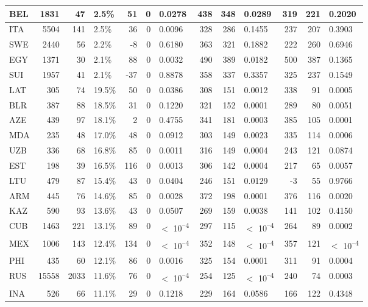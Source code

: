 \begin{tabular}{l|r|r|l|r|r|l|r|r|l|r|r|l}
\hline
BEL & 1831 & 47 & 2.5\% & 51 & 0 & 0.0278 & 438 & 348 & 0.0289 & 319 & 221 & 0.2020\\
\hline
ITA & 5504 & 141 & 2.5\% & 36 & 0 & 0.0096 & 328 & 286 & 0.1455 & 237 & 207 & 0.3903\\
\hline
SWE & 2440 & 56 & 2.2\% & -8 & 0 & 0.6180 & 363 & 321 & 0.1882 & 222 & 260 & 0.6946\\
\hline
EGY & 1371 & 30 & 2.1\% & 88 & 0 & 0.0032 & 490 & 389 & 0.0182 & 500 & 387 & 0.1365\\
\hline
SUI & 1957 & 41 & 2.1\% & -37 & 0 & 0.8878 & 358 & 337 & 0.3357 & 325 & 237 & 0.1549\\
\hline
LAT & 305 & 74 & 19.5\% & 50 & 0 & 0.0386 & 308 & 151 & 0.0012 & 338 & 91 & 0.0005\\
\hline
BLR & 387 & 88 & 18.5\% & 31 & 0 & 0.1220 & 321 & 152 & 0.0001 & 289 & 80 & 0.0051\\
\hline
AZE & 439 & 97 & 18.1\% & 2 & 0 & 0.4755 & 341 & 181 & 0.0003 & 385 & 105 & 0.0001\\
\hline
MDA & 235 & 48 & 17.0\% & 48 & 0 & 0.0912 & 303 & 149 & 0.0023 & 335 & 114 & 0.0006\\
\hline
UZB & 336 & 68 & 16.8\% & 85 & 0 & 0.0011 & 316 & 149 & 0.0004 & 243 & 121 & 0.0874\\
\hline
EST & 198 & 39 & 16.5\% & 116 & 0 & 0.0013 & 306 & 142 & 0.0004 & 217 & 65 & 0.0057\\
\hline
LTU & 479 & 87 & 15.4\% & 43 & 0 & 0.0404 & 246 & 151 & 0.0129 & -3 & 55 & 0.9766\\
\hline
ARM & 445 & 76 & 14.6\% & 85 & 0 & 0.0028 & 372 & 198 & 0.0001 & 376 & 116 & 0.0020\\
\hline
KAZ & 590 & 93 & 13.6\% & 43 & 0 & 0.0507 & 269 & 159 & 0.0038 & 141 & 102 & 0.4150\\
\hline
CUB & 1463 & 221 & 13.1\% & 89 & 0 & $<$ 10\textsuperscript{--4} & 297 & 115 & $<$ 10\textsuperscript{--4} & 264 & 89 & 0.0002\\
\hline
MEX & 1006 & 143 & 12.4\% & 134 & 0 & $<$ 10\textsuperscript{--4} & 352 & 148 & $<$ 10\textsuperscript{--4} & 357 & 121 & $<$ 10\textsuperscript{--4}\\
\hline
PHI & 435 & 60 & 12.1\% & 86 & 0 & 0.0016 & 325 & 154 & 0.0001 & 311 & 91 & 0.0004\\
\hline
RUS & 15558 & 2033 & 11.6\% & 76 & 0 & $<$ 10\textsuperscript{--4} & 254 & 125 & $<$ 10\textsuperscript{--4} & 240 & 74 & 0.0003\\
\hline
INA & 526 & 66 & 11.1\% & 29 & 0 & 0.1218 & 229 & 164 & 0.0586 & 166 & 122 & 0.4348\\

\end{tabular}
